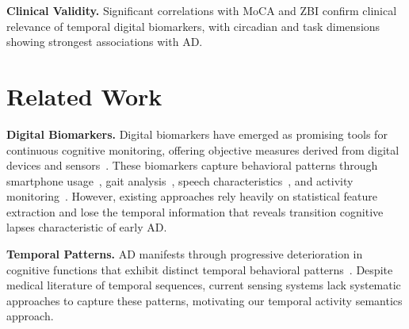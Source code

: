 \documentclass[sigconf, anonymous, 9pt, nonacm]{acmart}
\begin{document}
\noindent\textbf{Clinical Validity.} Significant correlations with MoCA and ZBI confirm clinical relevance of temporal digital biomarkers, with circadian and task dimensions showing strongest associations with AD.












\vspace{-1em}
\section{Related Work}
\label{sec:related}

\noindent\textbf{Digital Biomarkers.}
Digital biomarkers have emerged as promising tools for continuous cognitive monitoring, offering objective measures derived from digital devices and sensors~\cite{Piau2019_DigBiomarkers,Qi2025DigitalBiomarkers}. These biomarkers capture behavioral patterns through smartphone usage~\cite{Dagum2018_DigitalBiomarkers,Nguyen2023_KeystrokeBiomarker}, gait analysis~\cite{Cepukaityte2024_GaitReview}, speech characteristics~\cite{Lin2020_VoiceBiomarkers,Noto2024_SpeechAD,Robin2021_SpeechCognitiveImpairment}, and activity monitoring~\cite{Chinner2018_DigitalAssessmentCognition}. However, existing approaches rely heavily on statistical feature extraction and lose the temporal information that reveals transition cognitive lapses characteristic of early AD.

\noindent\textbf{Temporal Patterns.}
AD manifests through progressive deterioration in cognitive functions that exhibit distinct temporal behavioral patterns~\cite{jack2010hypothetical,Jack2013_DynamicBiomarkersAD}.
 Despite medical literature of temporal sequences, current sensing systems lack systematic approaches to capture these patterns, motivating our temporal activity semantics approach.
\end{document}
